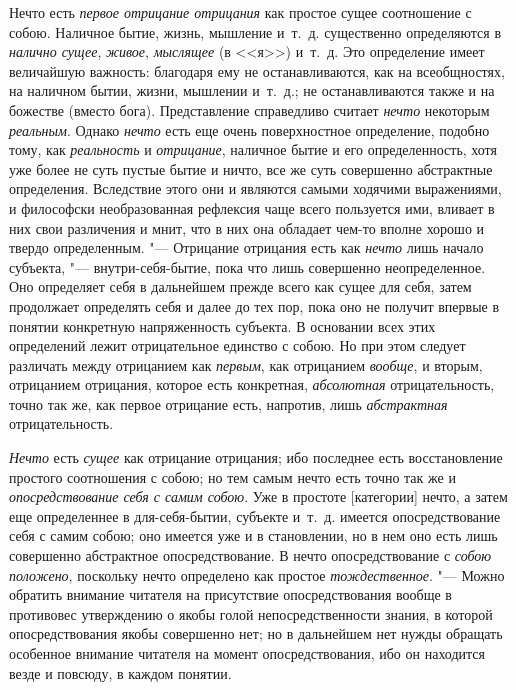 Нечто есть {\em первое отрицание отрицания} как простое
сущее соотношение с собою. Наличное бытие, жизнь, мышление и~т.~д.
существенно определяются в {\em налично сущее},
{\em живое}, {\em мыслящее} (в <<я>>)
и~т.~д. Это определение имеет величайшую важность: благодаря ему не
останавливаются, как на всеобщностях, на наличном бытии, жизни, мышлении
и~т.~д.; не останавливаются также и на божестве (вместо бога).
Представление справедливо считает {\em нечто} некоторым
{\em реальным}. Однако {\em нечто}
есть еще очень поверхностное определение, подобно тому, как
{\em реальность} и {\em отрицание},
наличное бытие и его определенность, хотя уже более не суть пустые бытие и
ничто, все же суть совершенно абстрактные определения. Вследствие этого они
и являются самыми ходячими выражениями, и философски необразованная
рефлексия чаще всего пользуется ими, вливает в них свои различения и мнит,
что в них она обладает чем-то вполне хорошо и твердо определенным. "---
Отрицание отрицания есть как {\em нечто} лишь начало
субъекта, "--- внутри-себя-бытие, пока что лишь совершенно неопределенное. Оно
определяет себя в дальнейшем прежде всего как сущее для себя, затем
продолжает определять себя и далее до тех пор, пока оно не получит впервые
в понятии конкретную напряженность субъекта. В основании всех этих
определений лежит отрицательное единство с собою. Но при этом следует
различать между отрицанием как {\em первым}, как
отрицанием {\em вообще}, и вторым, отрицанием
отрицания, которое есть конкретная, {\em абсолютная}
отрицательность, точно так же, как первое отрицание есть, напротив, лишь
{\em абстрактная} отрицательность.

{\em Нечто} есть {\em сущее} как
отрицание отрицания; ибо последнее есть восстановление простого соотношения
с собою; но тем самым нечто есть точно так же и
{\em опосредствование себя с самим собою}. Уже в
простоте [категории] нечто, а затем еще определеннее в для-себя-бытии,
субъекте и~т.~д. имеется опосредствование себя с самим собою; оно имеется
уже и в становлении, но в нем оно есть лишь совершенно абстрактное
опосредствование. В нечто опосредствование с {\em собою
положено}, поскольку нечто определено как простое
{\em тождественное}. "--- Можно обратить внимание читателя
на присутствие опосредствования вообще в противовес утверждению о якобы
голой непосредственности знания, в которой опосредствования якобы
совершенно нет; но в дальнейшем нет нужды обращать особенное внимание
читателя на момент опосредствования, ибо он находится везде и повсюду, в
каждом понятии.

